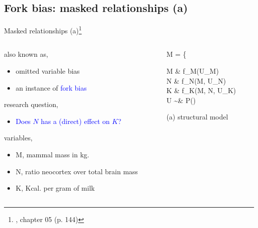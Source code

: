 \subsection{Fork bias: masked relationships (a)}
%
%
\begin{frame}[t, negative]
	\subsectionpage
\end{frame}
%
%
\begin{frame}
	{Masked relationships (a)\footnote{\citet{McElreath_2020}, chapter 05 (p. 144)}}
	\begin{columns}
		\begin{column}{0.5\textwidth}
			also known as,
			\begin{itemize}
				\item omitted variable bias
				\item an instance of \textcolor{blue}{fork bias}
			\end{itemize}
			
			research question, 
			\begin{itemize}
				\item \textcolor{blue}{Does $N$ has a (direct) effect on $K$?}
			\end{itemize}
			
			variables,
			\begin{itemize}
				\item M, mammal mass in kg.
				\item N, ratio neocortex over total brain mass
				\item K, Kcal. per gram of milk
			\end{itemize}
		\end{column}
		\begin{column}{0.5\textwidth}  
			\begin{equ}
				M = \left\{ \begin{aligned} 
					M \leftarrow & \; f_{M}(U_{M}) \\
					N \leftarrow & \; f_{N}(M, U_{N}) \\
					K \leftarrow & \; f_{K}(M, N, U_{K}) \\
					U \sim & \; P()
				\end{aligned} \right
				\caption*{(a) structural model}
			\end{equ}
			\begin{figure}
\end{figure}
\end{column}
\end{columns}
\end{frame}
